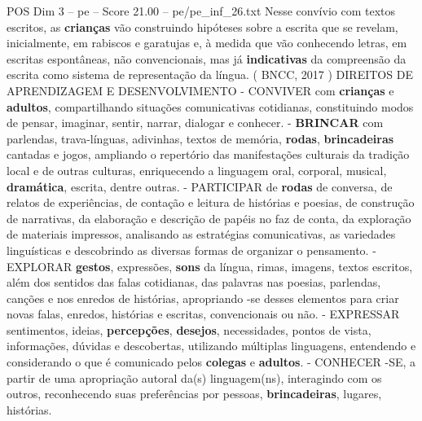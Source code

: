 \begin{textsample}{POS Dim 3 – pe – Score 21.00 – pe/pe\_inf\_26.txt}
Nesse convívio com textos escritos, as \textbf{crianças} vão construindo hipóteses sobre a escrita que se revelam, inicialmente, em rabiscos e garatujas e, à medida que vão conhecendo letras, em escritas espontâneas, não convencionais, mas já \textbf{indicativas} da compreensão da escrita como sistema de representação da língua. ( BNCC, 2017 ) DIREITOS DE APRENDIZAGEM E DESENVOLVIMENTO - CONVIVER com \textbf{crianças} e \textbf{adultos}, compartilhando situações comunicativas cotidianas, constituindo modos de pensar, imaginar, sentir, narrar, dialogar e conhecer. - \textbf{BRINCAR} com parlendas, trava-línguas, adivinhas, textos de memória, \textbf{rodas}, \textbf{brincadeiras} cantadas e jogos, ampliando o repertório das manifestações culturais da tradição local e de outras culturas, enriquecendo a linguagem oral, corporal, musical, \textbf{dramática}, escrita, dentre outras. - PARTICIPAR de \textbf{rodas} de conversa, de relatos de experiências, de contação e leitura de histórias e poesias, de construção de narrativas, da elaboração e descrição de papéis no faz de conta, da exploração de materiais impressos, analisando as estratégias comunicativas, as variedades linguísticas e descobrindo as diversas formas de organizar o pensamento. - EXPLORAR \textbf{gestos}, expressões, \textbf{sons} da língua, rimas, imagens, textos escritos, além dos sentidos das falas cotidianas, das palavras nas poesias, parlendas, canções e nos enredos de histórias, apropriando -se desses elementos para criar novas falas, enredos, histórias e escritas, convencionais ou não. - EXPRESSAR sentimentos, ideias, \textbf{percepções}, \textbf{desejos}, necessidades, pontos de vista, informações, dúvidas e descobertas, utilizando múltiplas linguagens, entendendo e considerando o que é comunicado pelos \textbf{colegas} e \textbf{adultos}. - CONHECER -SE, a partir de uma apropriação autoral da(s) linguagem(ns), interagindo com os outros, reconhecendo suas preferências por pessoas, \textbf{brincadeiras}, lugares, histórias.

\end{textsample}
